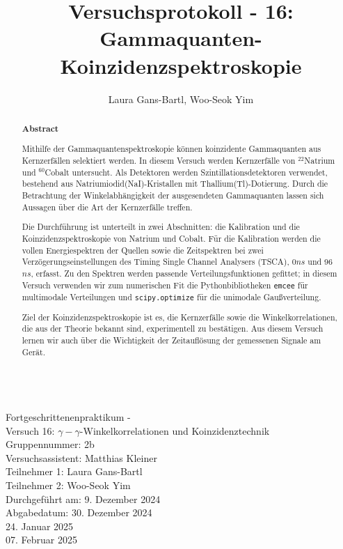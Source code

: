 \documentclass[%
aps,
onecolumn,
11pt,
tightenlines,
nofootinbib,
superscriptaddress,
floatfix,
prd,
]{revtex4-2}
\begin{document}
\title{\large Versuchsprotokoll - 16: Gammaquanten-Koinzidenzspektroskopie}

\author{Laura Gans-Bartl, Woo-Seok Yim}

\begin{abstract} 
	\vs{3mm}
	\centering
\begin{tcolorbox}
	\begin{center}		
		\textbf{Abstract}
	\end{center}\par
Mithilfe der Gammaquantenspektroskopie können koinzidente Gammaquanten aus Kernzerfällen selektiert werden. In diesem Versuch werden Kernzerfälle von $^{22}$Natrium und $^{60}$Cobalt untersucht. Als Detektoren werden Szintillationsdetektoren verwendet, bestehend aus Natriumiodid(NaI)-Kristallen mit Thallium(Tl)-Dotierung. Durch die Betrachtung der Winkelabhängigkeit der ausgesendeten Gammaquanten lassen sich Aussagen über die Art der Kernzerfälle treffen.\par 
Die Durchführung ist unterteilt in zwei Abschnitten: die Kalibration und die Koinzidenzspektroskopie von Natrium und Cobalt. Für die Kalibration werden die vollen Energiespektren der Quellen sowie die Zeitspektren bei zwei Verzögerungseinstellungen des Timing Single Channel Analysers (TSCA), 0$ns$ und 96$ns$, erfasst. Zu den Spektren werden passende Verteilungsfunktionen gefittet; in diesem Versuch verwenden wir zum numerischen Fit die Pythonbibliotheken \texttt{emcee} für multimodale Verteilungen und \texttt{scipy.optimize} für die unimodale Gaußverteilung.\par
Ziel der Koinzidenzspektroskopie ist es, die Kernzerfälle sowie die Winkelkorrelationen, die aus der Theorie bekannt sind, experimentell zu bestätigen. Aus diesem Versuch lernen wir auch über die Wichtigkeit der Zeitauflösung der gemessenen Signale am Gerät.
\end{tcolorbox}
\end{abstract}
\begin{center}
	\\
	{\fontsize{20}{10}\selectfont Fortgeschrittenenpraktikum - \\[5mm]
	Versuch 16: $\gamma - \gamma$-Winkelkorrelationen und Koinzidenztechnik\\ [10mm]
	Gruppennummer: 2b\\[5mm]
	Versuchsassistent: Matthias Kleiner\\[5mm]
	Teilnehmer 1: Laura Gans-Bartl \\[5mm]
	Teilnehmer 2: Woo-Seok Yim \\[5mm]
	Durchgeführt am: 9. Dezember 2024 \\[5mm]
	Abgabedatum: 30. Dezember 2024 \\
	\hspace{100pt} 24. Januar 2025 \\
	\hspace{110pt} 07. Februar 2025}
\end{center}
\newpage
\maketitle
\newpage
\tableofcontents
\newpage
\end{document}
